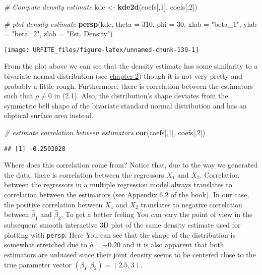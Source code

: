 \documentclass[]{book}
\newenvironment{Shaded}{\begin{snugshade}}{\end{snugshade}}
\newcommand{\KeywordTok}[1]{\textcolor[rgb]{0.13,0.29,0.53}{\textbf{#1}}}
\newcommand{\DataTypeTok}[1]{\textcolor[rgb]{0.13,0.29,0.53}{#1}}
\newcommand{\DecValTok}[1]{\textcolor[rgb]{0.00,0.00,0.81}{#1}}
\newcommand{\StringTok}[1]{\textcolor[rgb]{0.31,0.60,0.02}{#1}}
\newcommand{\CommentTok}[1]{\textcolor[rgb]{0.56,0.35,0.01}{\textit{#1}}}
\newcommand{\NormalTok}[1]{#1}
\theoremstyle{definition}
\theoremstyle{definition}
\theoremstyle{definition}
\theoremstyle{remark}
\begin{document}
\begin{Shaded}
\begin{Highlighting}[]
\CommentTok{# Compute density estimate}
\NormalTok{kde <-}\StringTok{ }\KeywordTok{kde2d}\NormalTok{(coefs[,}\DecValTok{1}\NormalTok{], coefs[,}\DecValTok{2}\NormalTok{])}

\CommentTok{# plot density estimate}
\KeywordTok{persp}\NormalTok{(kde,  }\DataTypeTok{theta =} \DecValTok{310}\NormalTok{, }\DataTypeTok{phi =} \DecValTok{30}\NormalTok{, }\DataTypeTok{xlab =} \StringTok{"beta_1"}\NormalTok{, }\DataTypeTok{ylab =} \StringTok{"beta_2"}\NormalTok{, }\DataTypeTok{zlab =} \StringTok{"Est. Density"}\NormalTok{)}
\end{Highlighting}
\end{Shaded}

\begin{center}\texttt{[image: URFITE\_files/figure-latex/unnamed-chunk-139-1]} \end{center}

From the plot above we can see that the density estimate has some
similarity to a bivariate normal distribution (see \href{Ch2}{chapter
2}) though it is not very pretty and probably a little rough.
Furthermore, there is correlation between the estimators such that
\(\rho\neq0\) in (2.1). Also, the distribution's shape deviates from the
symmetric bell shape of the bivariate standard normal distribution and
has an eliptical surface area instead.

\begin{Shaded}
\begin{Highlighting}[]
\CommentTok{# estimate correlation between estimators}
\KeywordTok{cor}\NormalTok{(coefs[,}\DecValTok{1}\NormalTok{], coefs[,}\DecValTok{2}\NormalTok{])}
\end{Highlighting}
\end{Shaded}

\begin{verbatim}
## [1] -0.2503028
\end{verbatim}

Where does this correlation come from? Notice that, due to the way we
generated the data, there is correlation between the regressors \(X_1\)
and \(X_2\). Correlation between the regressors in a multiple regression
model always translates to correlation between the estimators (see
Appendix 6.2 of the book). In our case, the positive correlation between
\(X_1\) and \(X_2\) translates to negative correlation between
\(\hat\beta_1\) and \(\hat\beta_2\). To get a better feeling You can
vary the point of view in the subsequent smooth interactive 3D plot of
the same density estimate used for plotting with \texttt{persp}. Here
You can see that the shape of the distribution is somewhat stretched due
to \(\hat\rho=-0.20\) and it is also apparent that both estimators are
unbiased since their joint density seems to be centered close to the
true parameter vector \((\beta_1,\beta_2) = (2.5,3)\).
\end{document}
